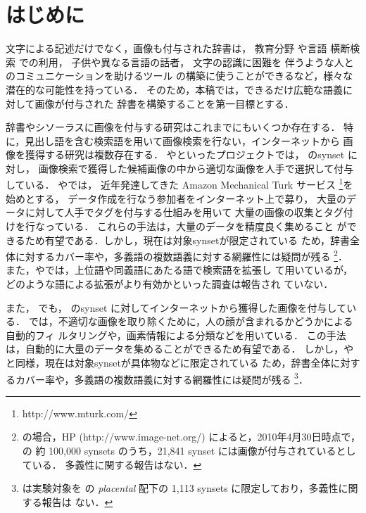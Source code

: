 \documentclass[japanese]{jnlp_1.4}
\newcommand{\WN}{}
\newcommand{\IN}{}
\newcommand{\PN}{}
\newcommand{\IO}{}
\begin{document}
\maketitle



\section{はじめに} \label{sec:introduction}

文字による記述だけでなく，画像も付与された辞書は，
教育分野 \cite{Popescu:Millet:etc:2006}や言語
\linebreak
横断検索
\cite{Hayashi:Bora:Nagata:2012j}での利用，
子供や異なる言語の話者\cite{Suwa:Miyabe:Yoshino:2012j}，
文字の認識に困難を
\linebreak
伴うような人とのコミュニケーションを助けるツール
\cite{Mihalcea:Leong:2008,Goldberg:Rosin:Zhu:Dyer:2009}
の構築に使うことができるなど，様々な潜在的な可能性を持っている．
そのため，本稿では，できるだけ広範な語義に対して画像が付与された
辞書を構築することを第一目標とする．

辞書やシソーラスに画像を付与する研究はこれまでにもいくつか存在する．
特に，見出し語を含む検索語を用いて画像検索を行ない，インターネットから
画像を獲得する研究は複数存在する．
\PN \cite{PicNet} や\IN \cite{ImageNet}といったプロジェクトでは，
\WN{} \cite{_Fellbaum:1998}のsynset に対し，
画像検索で獲得した候補画像の中から適切な画像を人手で選択して付与している．
\PN{}や\IN{}では，
近年発達してきた Amazon Mechanical Turk サービス
\footnote{http://www.mturk.com/}を始めとする，
データ作成を行なう参加者をインターネット上で募り，
大量のデータに対して人手でタグを付与する仕組みを用いて
大量の画像の収集とタグ付けを行なっている．
これらの手法は，大量のデータを精度良く集めること
ができるため有望である．しかし，現在は対象synsetが限定されている
ため，辞書全体に対するカバー率や，多義語の複数語義に対する網羅性には疑問が残る
\footnote{\IN{} の場合，HP (http://www.image-net.org/)
によると，2010年4月30日時点で，\WN{} の
約 100,000 synsets のうち，21,841 synset には画像が付与されているとしている．
多義性に関する報告はない．}．
また，\PN{}や\IN{}では，上位語や同義語にあたる語で検索語を拡張し
て用いているが，どのような語による拡張がより有効かといった調査は報告され
ていない．


また，\IO{}
\cite{Popescu:Millet:etc:2006,Popescu:Millet:etc:2007,Zinger:Millet:etc:2006}
でも，\WN{} のsynset に対してインターネットから獲得した画像を付与している．
\IO{}では，不適切な画像を取り除くために，人の顔が含まれるかどうかによる
自動的フィ
ルタリングや，画素情報による分類などを用いている．
この手法は，自動的に大量のデータを集めることができるため有望である．
しかし，\PN{}や\IN{}と同様，現在は対象synsetが具体物などに限定されている
ため，辞書全体に対するカバー率や，多義語の複数語義に対する網羅性には疑問が残る
\footnote{\cite{Popescu:Millet:etc:2007} は実験対象を\WN{} の
    \textit{placental} 配下の 1,113 synsets に限定しており，多義性に関する報告は
ない．}．
\end{document}
